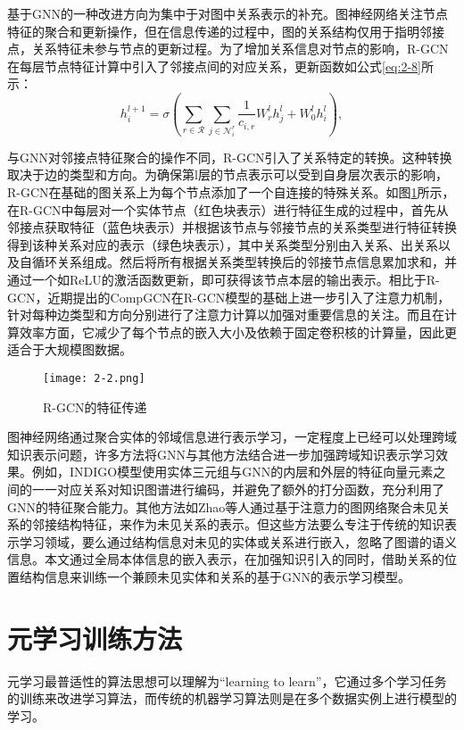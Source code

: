 基于GNN的一种改进方向为集中于对图中关系表示的补充。图神经网络关注节点特征的聚合和更新操作，但在信息传递的过程中，图的关系结构仅用于指明邻接点，关系特征未参与节点的更新过程。为了增加关系信息对节点的影响，R-GCN在每层节点特征计算中引入了邻接点间的对应关系，更新函数如公式\ref{eq:2-8}所示：
\begin{equation}
  h_{i}^{l+1} = \sigma \left( \sum_{r\in\mathcal{R}} \sum_{j\in\mathcal{N}_{i}^{r}} \frac{1}{c_{i,r}}W_{r}^{l}h_{j}^{l} + W_{0}^{l}h_{i}^{l}\right), \label{eq:2-8}
\end{equation}

与GNN对邻接点特征聚合的操作不同，R-GCN引入了关系特定的转换。这种转换取决于边的类型和方向。为确保第l层的节点表示可以受到自身层次表示的影响，R-GCN在基础的图关系上为每个节点添加了一个自连接的特殊关系。如图\ref{fig:2-2}所示，在R-GCN中每层对一个实体节点（红色块表示）进行特征生成的过程中，首先从邻接点获取特征（蓝色块表示）并根据该节点与邻接节点的关系类型进行特征转换得到该种关系对应的表示（绿色块表示），其中关系类型分别由入关系、出关系以及自循环关系组成。然后将所有根据关系类型转换后的邻接节点信息累加求和，并通过一个如ReLU的激活函数更新，即可获得该节点本层的输出表示。相比于R-GCN，近期提出的CompGCN在R-GCN模型的基础上进一步引入了注意力机制，针对每种边类型和方向分别进行了注意力计算以加强对重要信息的关注。而且在计算效率方面，它减少了每个节点的嵌入大小及依赖于固定卷积核的计算量，因此更适合于大规模图数据。
\begin{figure}[h]
  \centering
  \texttt{[image: 2-2.png]}
  \caption{R-GCN的特征传递}
  \label{fig:2-2}
\end{figure}

图神经网络通过聚合实体的邻域信息进行表示学习，一定程度上已经可以处理跨域知识表示问题，许多方法将GNN与其他方法结合进一步加强跨域知识表示学习效果。例如，INDIGO\cite{liu2021indigo}模型使用实体三元组与GNN的内层和外层的特征向量元素之间的一一对应关系对知识图谱进行编码，并避免了额外的打分函数，充分利用了GNN的特征聚合能力。其他方法如Zhao\cite{zhao2020attention}等人通过基于注意力的图网络聚合未见关系的邻接结构特征，来作为未见关系的表示。但这些方法要么专注于传统的知识表示学习领域，要么通过结构信息对未见的实体或关系进行嵌入，忽略了图谱的语义信息。本文通过全局本体信息的嵌入表示，在加强知识引入的同时，借助关系的位置结构信息来训练一个兼顾未见实体和关系的基于GNN的表示学习模型。

\section{元学习训练方法}
元学习最普适性的算法思想可以理解为“learning to learn”，它通过多个学习任务的训练来改进学习算法，而传统的机器学习算法则是在多个数据实例上进行模型的学习。

